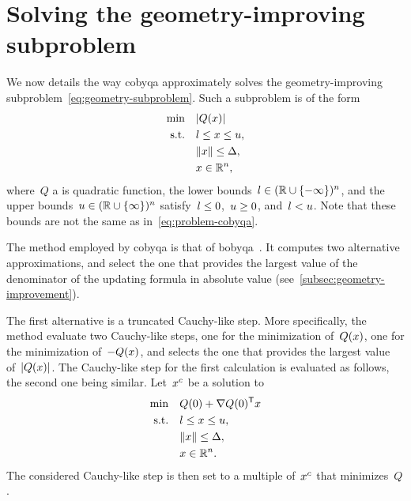 
\section{Solving the geometry-improving subproblem}
\label{sec:cobyqa-geometry-improving}

We now details the way \gls{cobyqa} approximately solves the geometry-improving subproblem~\cref{eq:geometry-subproblem}.
Such a subproblem is of the form
\begin{subequations}
    \label{eq:geometry-simple}
    \begin{align}
        \min        & \quad \abs{Q(\iter)}\\
        \text{s.t.} & \quad \xl \le \iter \le \xu,\\
                    & \quad \norm{\iter} \le \rad,\\
                    & \quad \iter \in \R^n,
    \end{align}
\end{subequations}
where~$Q$ a is quadratic function, the lower bounds~$l \in (\mathbb{R} \cup \{-\infty\})^n$, and the upper bounds~$u \in (\mathbb{R} \cup \{\infty\})^n$ satisfy~$l \le 0$,~$u \ge 0$, and~$l < u$.
Note that these bounds are not the same as in~\cref{eq:problem-cobyqa}.

The method employed by \gls{cobyqa} is that of \gls{bobyqa}~\cite{Powell_2009}.
It computes two alternative approximations, and select the one that provides the largest value of the denominator of the updating formula in absolute value (see~\cref{subsec:geometry-improvement}).

The first alternative is a truncated Cauchy-like step.
More specifically, the method evaluate two Cauchy-like steps, one for the minimization of~$Q(\iter)$, one for the minimization of~$-Q(\iter)$, and selects the one that provides the largest value of~$\abs{Q(\iter)}$.
The Cauchy-like step for the first calculation is evaluated as follows, the second one being similar.
Let~$\iter[c]$ be a solution to
\begin{align*}
    \min        & \quad Q(0) + \nabla Q(0)^{\T} \iter\\
    \text{s.t.} & \quad \xl \le \iter \le \xu,\\
                & \quad \norm{\iter} \le \rad,\\
                & \quad \iter \in \R^n.
\end{align*}
The considered Cauchy-like step is then set to a multiple of~$\iter[c]$ that minimizes~$Q$.

